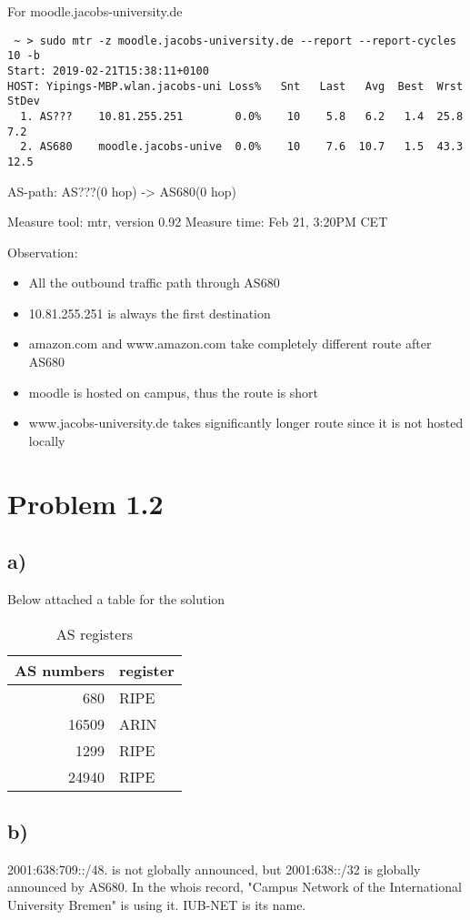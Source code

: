 \documentclass[11pt]{article}
\begin{document}
For moodle.jacobs-university.de
\begin{verbatim}
 ~ > sudo mtr -z moodle.jacobs-university.de --report --report-cycles 10 -b
Start: 2019-02-21T15:38:11+0100
HOST: Yipings-MBP.wlan.jacobs-uni Loss%   Snt   Last   Avg  Best  Wrst StDev
  1. AS???    10.81.255.251        0.0%    10    5.8   6.2   1.4  25.8   7.2
  2. AS680    moodle.jacobs-unive  0.0%    10    7.6  10.7   1.5  43.3  12.5
\end{verbatim}
AS-path: AS???(0 hop) -> AS680(0 hop)

Measure tool: mtr, version 0.92
Measure time: Feb 21, 3:20PM CET

Observation: 
\begin{itemize}
\item All the outbound traffic path through AS680
\item 10.81.255.251 is always the first destination
\item amazon.com and www.amazon.com take completely different route after AS680
\item moodle is hosted on campus, thus the route is short
\item www.jacobs-university.de takes significantly longer route since it is not hosted locally
\end{itemize}
\section{Problem 1.2}
\label{sec:orgf1705fd}
\subsection{a)}
\label{sec:org9fcf433}
Below attached a table for the solution
\begin{table}[htbp]
\caption{AS registers}
\centering
\begin{tabular}{rl}
AS numbers & register\\
\hline
680 & RIPE\\
16509 & ARIN\\
1299 & RIPE\\
24940 & RIPE\\
\end{tabular}
\end{table}
\subsection{b)}
\label{sec:orgc1752eb}
2001:638:709::/48. is not globally announced, but 2001:638::/32 is globally announced by AS680.
In the whois record, "Campus Network of the International University Bremen" is using it. IUB-NET
is its name.
\end{document}
